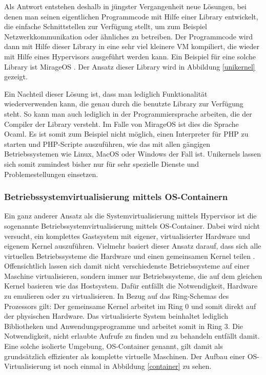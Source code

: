 Als Antwort entstehen deshalb in jüngster Vergangenheit neue Lösungen, bei denen man seinen eigentlichen Programmcode mit Hilfe einer Library entwickelt, die einfache Schnittstellen zur Verfügung stellt, um zum Beispiel Netzwerkkommunikation oder ähnliches zu betreiben. Der Programmcode wird dann mit Hilfe dieser Library in eine sehr viel kleinere \ac{VM} kompiliert, die wieder mit Hilfe eines Hypervisors ausgeführt werden kann. Ein Beispiel für eine solche Library ist MirageOS \citep[Vgl.][]{MadMorAnd13}. Der Ansatz dieser Library wird in Abbildung \ref{unikernel} gezeigt.

Ein Nachteil dieser Lösung ist, dass man lediglich Funktionalität wiederverwenden kann, die genau durch die benutzte Library zur Verfügung steht. So kann man auch lediglich in der Programmiersprache arbeiten, die der Compiler der Library versteht. Im Falle von MirageOS ist dies die Sprache Ocaml. Es ist somit zum Beispiel nicht möglich, einen Interpreter für \ac{PHP} zu starten und PHP-Scripte auszuführen, wie das mit allen gängigen Betriebssystemen wie Linux, MacOS oder Windows der Fall ist. Unikernels lassen sich somit zumindest bisher nur für sehr spezielle Dienste und Problemestellungen einsetzen.

\subsubsection{Betriebssystemvirtualisierung mittels OS-Containern}

Ein ganz anderer Ansatz als die Systemvirtualisierung mittels Hypervisor ist die sogenannte Betriebssystemvirtualisierung mittels OS-Container. Dabei wird nicht versucht, ein komplettes Gastsystem mit eigener, virtualisierter Hardware und eigenem Kernel auszuführen. Vielmehr basiert dieser Ansatz darauf, dass sich alle virtuellen Betriebssysteme die Hardware und einen gemeinsamen Kernel teilen \citep[Vgl.][Introduction]{Turnball14}. Offensichtlich lassen sich damit nicht verschiedenste Betriebssysteme auf einer Maschine virtualisieren, sondern immer nur Betriebssysteme, die auf dem gleichen Kernel basieren wie das Hostsystem. Dafür entfällt die Notwendigkeit, Hardware zu emulieren oder zu virtualisieren. In Bezug auf das Ring-Schemas des Prozessors gilt: Der gemeinsame Kernel arbeitet im Ring 0 und somit direkt auf der physischen Hardware. Das virtualisierte System beinhaltet lediglich Bibliotheken und Anwendungsprogramme und arbeitet somit in Ring 3. Die Notwendigkeit, nicht erlaubte Aufrufe zu finden und zu behandeln entfällt damit. Eine solche isolierte Umgebung, OS-Container genannt, gilt damit als grundsätzlich effizienter als komplette virtuelle Maschinen. Der Aufbau einer OS-Virtualisierung ist noch einmal in Abbildung \ref{container} zu sehen.


